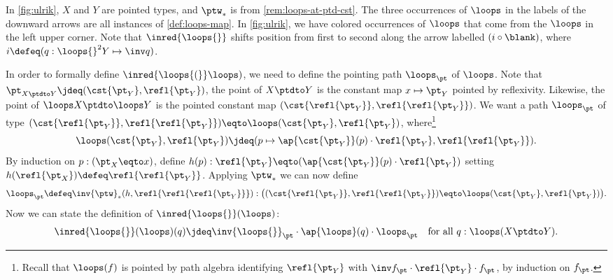 \begin{remark}\label{rem:grpHomOK}
\newcommand{\redloops}[1]{\inred{\loops{#1}}}
In \cref{fig:ulrik}, $X$ and $Y$ are pointed types,
and $\ptw_*$ is from \cref{rem:loops-at-ptd-cst}.
The three occurrences of $\loops$ in the labels of the
downward arrows are all instances of \cref{def:loops-map}.
In \cref{fig:ulrik}, we have colored occurrences of 
$\loops$ that come from the $\loops$ in the left upper corner.
Note that $\redloops{}$ shifts position from first to 
second along the arrow labelled $(i\circ\blank)$,
where $i\defeq (q:\loops{}^2 Y \mapsto \inv q)$.

\begin{marginfigure}
  \caption{\label{fig:ulrik}Fill ($i$ is path reversal)!} 
\end{marginfigure}

In order to formally define $\redloops(\loops)$, we need
to define the pointing path $\loops_\pt$ of $\loops$.
Note that $\pt_{X\ptdto Y} \jdeq (\cst{\pt_Y},\refl{\pt_Y})$,
\ie the point of $X\ptdto Y$ is the constant map 
$x\mapsto\pt_Y$ pointed by reflexivity.
Likewise, the point of $\loops X\ptdto \loops Y$ is the pointed constant 
map $(\cst{\refl{\pt_Y}},\refl{\refl{\pt_Y}})$.
We want a path $\loops_\pt$ of type
$(\cst{\refl{\pt_Y}},\refl{\refl{\pt_Y}}) \eqto 
\loops(\cst{\pt_Y},\refl{\pt_Y})$, where\footnote{%
Recall that $\loops(f)$ is pointed by path algebra
identifying $\refl{\pt_Y}$ with $\inv f_\pt\cdot\refl{\pt_Y}\cdot f_\pt$, by
induction on $f_\pt$.}
\[
\loops(\cst{\pt_Y},\refl{\pt_Y}) \jdeq
(p\mapsto \ap{\cst{\pt_Y}}(p) \cdot \refl{\pt_Y},\refl{\refl{\pt_Y}}).
\]
By induction on $p:(\pt_X\eqto x)$, define
$h(p): \refl{\pt_Y} \eqto (\ap{\cst{\pt_Y}}(p)\cdot \refl{\pt_Y})$
setting $h(\refl{\pt_X})\defeq \refl{\refl{\pt_Y}}$.
Applying $\ptw_*$ we can now define
\[
\loops_\pt \defeq \inv{\ptw}_*(h,\refl{\refl{\refl{\pt_Y}}}):
\bigl((\cst{\refl{\pt_Y}},\refl{\refl{\pt_Y}}) \eqto 
\loops(\cst{\pt_Y},\refl{\pt_Y})\bigr).
\]
Now we can state the definition of $\redloops{}(\loops)$:
\[
\redloops{}(\loops)(q) \jdeq
\inv{\loops{}}_\pt \cdot \ap{\loops}(q) \cdot \loops_\pt
\quad\text{for all $q:\loops(X\ptdto Y)$}.
\]
 

\end{remark}
